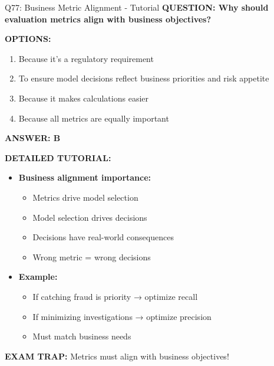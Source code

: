 \documentclass[8pt]{beamer}
\begin{document}
	\begin{frame}{Q77: Business Metric Alignment - Tutorial}
		\fontsize{6.5}{7.5}\selectfont
		\textbf{QUESTION: Why should evaluation metrics align with business objectives?}
		
		\vspace{0.1cm}
		\textbf{OPTIONS:}
		\begin{enumerate}
			\item Because it's a regulatory requirement
			\item To ensure model decisions reflect business priorities and risk appetite
			\item Because it makes calculations easier
			\item Because all metrics are equally important
		\end{enumerate}
		
		\vspace{0.1cm}
		\textcolor{myblue}{\textbf{ANSWER: B}}
		
		\vspace{0.1cm}
		\textbf{DETAILED TUTORIAL:}
		\begin{itemize}
			\item \textbf{Business alignment importance:}
			\begin{itemize}
				\item Metrics drive model selection
				\item Model selection drives decisions
				\item Decisions have real-world consequences
				\item Wrong metric = wrong decisions
			\end{itemize}
			\item \textbf{Example:}
			\begin{itemize}
				\item If catching fraud is priority → optimize recall
				\item If minimizing investigations → optimize precision
				\item Must match business needs
			\end{itemize}
		\end{itemize}
		
		\textcolor{myred}{\textbf{EXAM TRAP:}} Metrics must \textcolor{myblue}{align with business objectives}!
	\end{frame}
	
\end{document}
